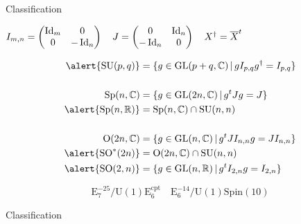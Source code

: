 \documentclass[10pt]{beamer}
\begin{document}
\begin{frame}{Classification}

$
 I_{m,n} = \begin{pmatrix} \operatorname{\mathrm{Id}}_m & 0 \\ 0 & -\operatorname{\mathrm{Id}}_n \end{pmatrix} \quad J = \begin{pmatrix} 0 & \operatorname{\mathrm{Id}}_n \\ -\operatorname{\mathrm{Id}}_n & 0 \end{pmatrix} \quad X^\dag = \overline{X}^t
$

\vspace{0.2cm}
\begin{equation*}
\begin{aligned}
\alert{\mathrm{SU}(p,q)} &= \{ g \in \mathrm{GL}(p +q, \mathbb{C}) \,|\, g I_{p,q}g^\dag = I_{p,q} \}\\[0.5cm]
\mathrm{Sp}(n, \mathbb{C}) &= \{ g \in \mathrm{GL}(2n, \mathbb{C}) \,|\, g^t J g  = J \}\\
\alert{\mathrm{Sp}(n, \mathbb{R})} &= \mathrm{Sp}(n, \mathbb{C}) \cap \mathrm{SU}(n,n) \\[0.5cm]
\mathrm{O}(2n, \mathbb{C}) &= \{ g \in \mathrm{GL}(n, \mathbb{C}) \,|\, g^t JI_{n,n} g  = JI_{n,n} \}\\
\alert{\mathrm{SO}^*(2n)} &=  \mathrm{O}(2n, \mathbb{C}) \cap \mathrm{SU}(n,n) \\
\alert{\mathrm{SO}(2, n)} &= \{ g \in \mathrm{GL}(n, \mathbb{R})\,|\, g^t I_{2,n} g  = I_{2,n} \}
\end{aligned}
\end{equation*}

\alert{
\[
	\mathrm{E^{-25}_7 / U(1)E_6^\text{cpt} \quad E^{-14}_6 / U(1)Spin(10)} 
\]
}
\end{frame}

\begin{frame}{Classification}

	
	
	

\end{frame}
\end{document}
